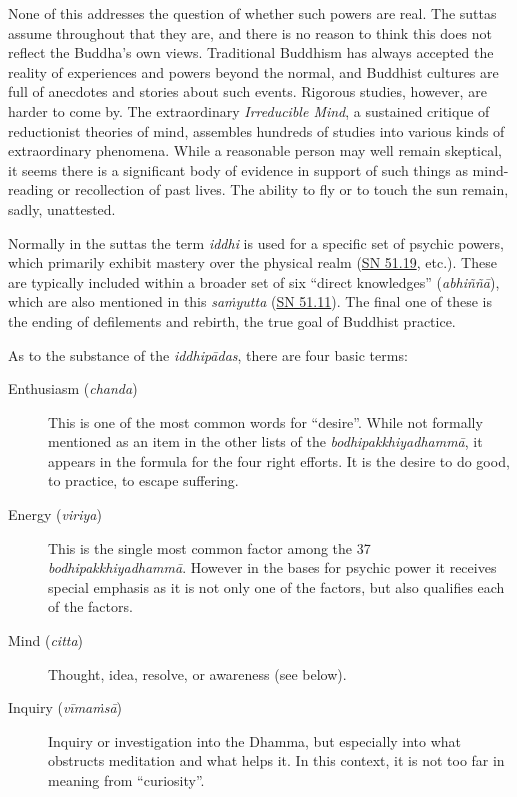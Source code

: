 \documentclass[12pt,openany]{book}%
\begin{document}
None of this addresses the question of whether such powers are real. The suttas assume throughout that they are, and there is no reason to think this does not reflect the Buddha’s own views. Traditional Buddhism has always accepted the reality of experiences and powers beyond the normal, and Buddhist cultures are full of anecdotes and stories about such events. Rigorous studies, however, are harder to come by. The extraordinary \textit{Irreducible Mind}, a sustained critique of reductionist theories of mind, assembles hundreds of studies into various kinds of extraordinary phenomena. While a reasonable person may well remain skeptical, it seems there is a significant body of evidence in support of such things as mind-reading or recollection of past lives. The ability to fly or to touch the sun remain, sadly, unattested.

Normally in the suttas the term \textit{iddhi} is used for a specific set of psychic powers, which primarily exhibit mastery over the physical realm (\href{https://suttacentral.net/sn51.19}{SN 51.19}, etc.). These are typically included within a broader set of six “direct knowledges” (\textit{\textsanskrit{abhiññā}}), which are also mentioned in this \textit{\textsanskrit{saṁyutta}} (\href{https://suttacentral.net/sn51.11}{SN 51.11}). The final one of these is the ending of defilements and rebirth, the true goal of Buddhist practice.

As to the substance of the \textit{\textsanskrit{iddhipādas}}, there are four basic terms:

\begin{description}%
\item[Enthusiasm (\textit{chanda})] This is one of the most common words for “desire”. While not formally mentioned as an item in the other lists of the \textit{\textsanskrit{bodhipakkhiyadhammā}}, it appears in the formula for the four right efforts. It is the desire to do good, to practice, to escape suffering.%
\item[Energy (\textit{viriya})] This is the single most common factor among the 37 \textit{\textsanskrit{bodhipakkhiyadhammā}}. However in the bases for psychic power it receives special emphasis as it is not only one of the factors, but also qualifies each of the factors.%
\item[Mind (\textit{citta})] Thought, idea, resolve, or awareness (see below).%
\item[Inquiry (\textit{\textsanskrit{vīmaṁsā}})] Inquiry or investigation into the Dhamma, but especially into what obstructs meditation and what helps it. In this context, it is not too far in meaning from “curiosity”.%
\end{description}
\end{document}
